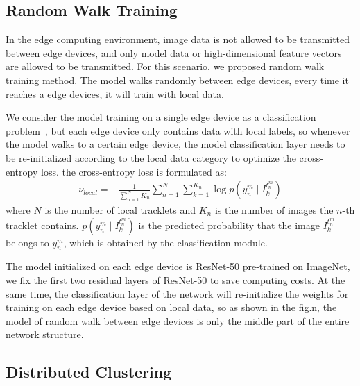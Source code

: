 \documentclass{article}
\begin{document}
\subsection{Random Walk Training}
In the edge computing environment, image data is not allowed to be transmitted between edge devices, and only model data or high-dimensional feature vectors are allowed to be transmitted. For this scenario, we proposed random walk training method. The model walks randomly between edge devices, every time it reaches a edge devices, it will train with local data.

We consider the model training on a single edge device as a classification problem~\cite{zheng2016person}, but each edge device only contains data with local labels, so whenever the model walks to a certain edge device, the model classification layer needs to be re-initialized according to the local data category to optimize the cross-entropy loss. the cross-entropy loss is formulated as:
\begin{equation}
\begin{aligned}
    \nu _{local}=-\frac{1}{\sum_{n=1}^{N} K_{n}}\sum_{n=1}^{N}\sum_{k=1}^{K_{n}}\log p(y_{n}^{m}\mid I_{k}^{t_{n}^{m}})
\end{aligned}
\end{equation}
where $N$ is the number of local tracklets and $K_{n}$ is the number of images the $n$-th tracklet contains. $p(y_{n}^{m}\mid I_{k}^{t_{n}^{m}})$ is the predicted probability that the image $I_{k}^{t_{n}^{m}}$ belongs to $y_{n}^{m}$, which is obtained by the classification module.


The model initialized on each edge device is ResNet-50 pre-trained on ImageNet, we fix the first two residual layers of ResNet-50 to save computing costs. At the same time, the classification layer of the network will re-initialize the weights for training on each edge device based on local data, so as shown in the fig.n, the model of random walk between edge devices is only the middle part of the entire network structure.








\subsection{Distributed Clustering}
\end{document}
